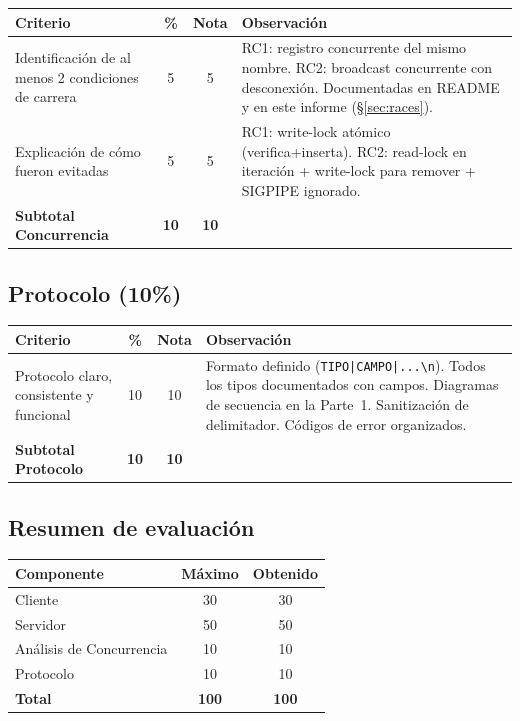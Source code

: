 \documentclass[12pt,a4paper]{article}
\begin{document}
\begin{longtable}{p{7.5cm}ccp{4cm}}
\toprule
\textbf{Criterio} & \textbf{\%} & \textbf{Nota} & \textbf{Observación} \\
\midrule
\endhead
Identificación de al menos 2 condiciones de carrera & 5 & 5 &
    RC1: registro concurrente del mismo nombre.
    RC2: broadcast concurrente con desconexión.
    Documentadas en README y en este informe (\S\ref{sec:races}). \\
\midrule
Explicación de cómo fueron evitadas & 5 & 5 &
    RC1: write-lock atómico (verifica+inserta).
    RC2: read-lock en iteración + write-lock para remover + SIGPIPE ignorado. \\
\midrule
\textbf{Subtotal Concurrencia} & \textbf{10} & \textbf{10} & \\
\bottomrule
\end{longtable}

\subsection{Protocolo (10\%)}

\begin{longtable}{p{7.5cm}ccp{4cm}}
\toprule
\textbf{Criterio} & \textbf{\%} & \textbf{Nota} & \textbf{Observación} \\
\midrule
\endhead
Protocolo claro, consistente y funcional & 10 & 10 &
    Formato definido (\texttt{TIPO|CAMPO|...\textbackslash n}).  Todos los tipos
    documentados con campos.  Diagramas de secuencia en la Parte~1.
    Sanitización de delimitador.  Códigos de error organizados. \\
\midrule
\textbf{Subtotal Protocolo} & \textbf{10} & \textbf{10} & \\
\bottomrule
\end{longtable}

\subsection{Resumen de evaluación}

\begin{center}
\begin{tabular}{lcc}
\toprule
\textbf{Componente} & \textbf{Máximo} & \textbf{Obtenido} \\
\midrule
Cliente                  & 30 & 30 \\
Servidor                 & 50 & 50 \\
Análisis de Concurrencia & 10 & 10 \\
Protocolo                & 10 & 10 \\
\midrule
\textbf{Total}           & \textbf{100} & \textbf{100} \\
\bottomrule
\end{tabular}
\end{center}
\end{document}
